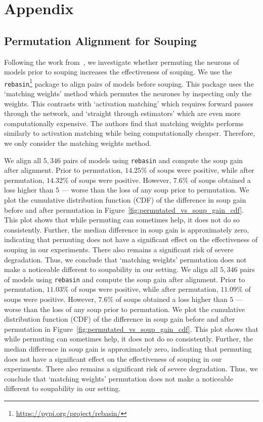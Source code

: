 \newpage
\appendix
\onecolumn
\section{Appendix}

\renewcommand{\thefigure}{A\arabic{figure}}
\setcounter{figure}{0}

\subsection{Permutation Alignment for Souping}\label{appendix:permutation_alignment}

Following the work from~\citet{gitrebasin}, we investigate whether permuting the neurons of models prior to souping increases the effectiveness of souping. We use the \texttt{rebasin}\footnote{\url{https://pypi.org/project/rebasin/}} package to align pairs of models before souping. This package uses the `matching weights' method which permutes the neurones by inspecting only the weights. This contrasts with `activation matching' which requires forward passes through the network, and `straight through estimators' which are even more computationally expensive. The authors find that matching weights performs similarly to activation matching while being computationally cheaper. Therefore, we only consider the matching weights method.

We align all $5,346$ pairs of models using \texttt{rebasin} and compute the soup gain after alignment. Prior to permutation, $14.25\%$ of soups were positive, while after permutation, $14.32\%$ of soups were positive. However, $7.6\%$ of soups obtained a loss higher than $5$ — worse than the loss of any soup prior to permutation. We plot the cumulative distribution function (CDF) of the difference in soup gain before and after permutation in Figure~\ref{fig:permutated_vs_soup_gain_cdf}. This plot shows that while permuting can sometimes help, it does not do so consistently. Further, the median difference in soup gain is approximately zero, indicating that permuting does not have a significant effect on the effectiveness of souping in our experiments. There also remains a significant risk of severe degradation. Thus, we conclude that `matching weights' permutation does not make a noticeable different to soupability in our setting.
We align all $5,346$ pairs of models using \texttt{rebasin} and compute the soup gain after alignment. Prior to permutation, $11.03\%$ of soups were positive, while after permutation, $11.09\%$ of soups were positive. However, $7.6\%$ of soups obtained a loss higher than $5$ — worse than the loss of any soup prior to permutation. We plot the cumulative distribution function (CDF) of the difference in soup gain before and after permutation in Figure~\ref{fig:permutated_vs_soup_gain_cdf}. This plot shows that while permuting can sometimes help, it does not do so consistently. Further, the median difference in soup gain is approximately zero, indicating that permuting does not have a significant effect on the effectiveness of souping in our experiments. There also remains a significant risk of severe degradation. Thus, we conclude that `matching weights' permutation does not make a noticeable different to soupability in our setting.

